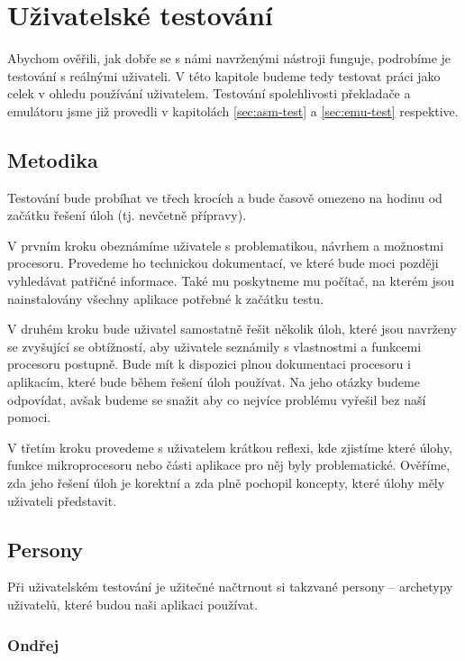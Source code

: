 \chapter{Uživatelské testování}

Abychom ověřili, jak dobře se s námi navrženými nástroji funguje, podrobíme je testování s reálnými uživateli. V této kapitole budeme tedy testovat práci jako celek v ohledu používání uživatelem. Testování spolehlivosti překladače a emulátoru jsme již provedli v kapitolách \ref{sec:asm-test} a \ref{sec:emu-test} respektive.

\section{Metodika}

Testování bude probíhat ve třech krocích a bude časově omezeno na hodinu od začátku řešení úloh (tj. nevčetně přípravy).

V prvním kroku obeznámíme uživatele s problematikou, návrhem a možnostmi procesoru. Provedeme ho technickou dokumentací, ve které bude moci později vyhledávat patřičné informace. Také mu poskytneme mu počítač, na kterém jsou nainstalovány všechny aplikace potřebné k začátku testu.

V druhém kroku bude uživatel samostatně řešit několik úloh, které jsou navrženy se zvyšující se obtížností, aby uživatele seznámily s vlastnostmi a funkcemi procesoru postupně. Bude mít k dispozici plnou dokumentaci procesoru i aplikacím, které bude během řešení úloh používat. Na jeho otázky budeme odpovídat, avšak budeme se snažit aby co nejvíce problému vyřešil bez naší pomoci.

V třetím kroku provedeme s uživatelem krátkou reflexi, kde zjistíme které úlohy, funkce mikroprocesoru nebo části aplikace pro něj byly problematické. Ověříme, zda jeho řešení úloh je korektní a zda plně pochopil koncepty, které úlohy měly uživateli představit.

\section{Persony}

Při uživatelském testování je užitečné načtrnout si takzvané persony -- archetypy uživatelů, které budou naši aplikaci používat.

\subsection{Ondřej}
\label{persona:a}

